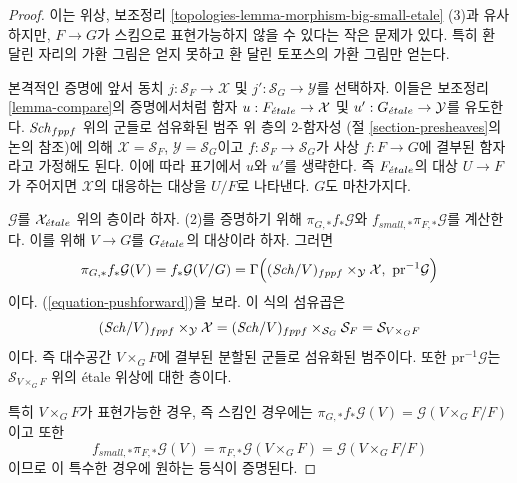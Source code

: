 \begin{proof}
이는 위상, 보조정리
\ref{topologies-lemma-morphism-big-small-etale} (3)과 유사하지만,
$F \to G$가 스킴으로 표현가능하지 않을 수 있다는 작은 문제가 있다.
특히 환 달린 자리의 가환 그림은 얻지 못하고 환 달린 토포스의
가환 그림만 얻는다.

\medskip\noindent
본격적인 증명에 앞서 동치 $j : \mathcal{S}_F \to \mathcal{X}$ 및
$j' : \mathcal{S}_G \to \mathcal{Y}$를 선택하자. 이들은 보조정리
\ref{lemma-compare}의 증명에서처럼 함자
$u : F_{\acute{e}tale} \to \mathcal{X}$ 및
$u' : G_{\acute{e}tale} \to \mathcal{Y}$를 유도한다.
$\mathit{Sch}_{fppf}$ 위의 군들로 섬유화된 범주 위 층의 2-함자성
(절 \ref{section-presheaves}의 논의 참조)에 의해
$\mathcal{X} = \mathcal{S}_F$, $\mathcal{Y} = \mathcal{S}_G$이고
$f : \mathcal{S}_F \to \mathcal{S}_G$가 사상 $f : F \to G$에
결부된 함자라고 가정해도 된다. 이에 따라 표기에서 $u$와 $u'$를
생략한다. 즉 $F_{\acute{e}tale}$의 대상 $U \to F$가 주어지면
$\mathcal{X}$의 대응하는 대상을 $U/F$로 나타낸다. $G$도 마찬가지다.

\medskip\noindent
$\mathcal{G}$를 $\mathcal{X}_{\acute{e}tale}$ 위의 층이라 하자.
(2)를 증명하기 위해 $\pi_{G, *}f_*\mathcal{G}$와
$f_{small, *}\pi_{F, *}\mathcal{G}$를 계산한다. 이를 위해
$V \to G$를 $G_{\acute{e}tale}$의 대상이라 하자. 그러면
$$
\pi_{G, *}f_*\mathcal{G}(V) = f_*\mathcal{G}(V/G) =
\Gamma\Big(
(\mathit{Sch}/V)_{fppf} \times_{\mathcal{Y}} \mathcal{X},
\ \text{pr}^{-1}\mathcal{G}\Big)
$$
이다. (\ref{equation-pushforward})을 보라. 이 식의 섬유곱은
$$
(\mathit{Sch}/V)_{fppf} \times_{\mathcal{Y}} \mathcal{X} =
(\mathit{Sch}/V)_{fppf} \times_{\mathcal{S}_G} \mathcal{S}_F =
\mathcal{S}_{V \times_G F}
$$
이다. 즉 대수공간 $V \times_G F$에 결부된 분할된 군들로 섬유화된
범주이다. 또한 $\text{pr}^{-1}\mathcal{G}$는
$\mathcal{S}_{V \times_G F}$ 위의 \'etale 위상에 대한 층이다.

\medskip\noindent
특히 $V \times_G F$가 표현가능한 경우, 즉 스킴인 경우에는
$\pi_{G, *}f_*\mathcal{G}(V) = \mathcal{G}(V \times_G F/F)$이고 또한
$$
f_{small, *}\pi_{F, *}\mathcal{G}(V) =
\pi_{F, *}\mathcal{G}(V \times_G F) =
\mathcal{G}(V \times_G F/F)
$$
이므로 이 특수한 경우에 원하는 등식이 증명된다.


\end{proof}
